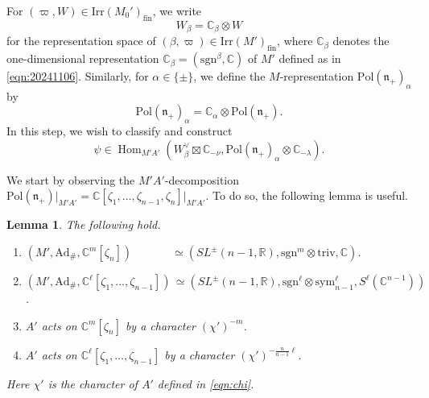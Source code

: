 \documentclass[reqno,11pt]{amsart}
\newtheorem{lem}[equation]{Lemma}
\theoremstyle{remark}
\theoremstyle{definition}
\numberwithin{equation}{section}
\newcommand{\gb}{\beta}
\newcommand{\ga}{\alpha}
\newcommand{\fn}{{\mathfrak n}}
\newcommand{\R}{\mathbb{R}}
\newcommand{\C}{\mathbb{C}}
\newcommand{\Ad}{\mathrm{Ad}}
\newcommand{\Hom}{\operatorname{Hom}}
\newcommand{\Pol}{\mathrm{Pol}}
\newcommand{\Irr}{\mathrm{Irr}}
\newcommand{\triv}{\mathrm{triv}}
\newcommand{\fin}{\mathrm{fin}}
\newcommand{\sym}{\mathrm{sym}}
\newcommand{\sgn}{\mathrm{sgn}}
\begin{document}
For $(\varpi, W) \in \Irr(M_0')_{\fin}$, we write
\begin{equation*}
W_{\beta} = \C_{\beta} \otimes W
\end{equation*}
for 
the representation
space of $(\beta, \varpi) \in \Irr(M')_{\fin}$, where 
$\C_\gb$ denotes the one-dimensional representation 
$\C_\gb = (\sgn^\beta, \C)$ of $M'$ defined as in 
\eqref{eqn:20241106}.
Similarly, for $\ga \in \{\pm\}$, we define 
the $M$-representation $\Pol(\fn_+)_\ga$ by
\begin{equation}\label{eqn:Pol}
\Pol(\fn_+)_\ga = \C_\ga \otimes \Pol(\fn_+).
\end{equation}
In this step, we wish to classify and construct
\begin{equation*}
\psi \in 
\Hom_{M'A'}(W_{\beta}^\vee\boxtimes \C_{-\nu}, 
\Pol(\fn_+)_{\alpha}
\otimes \C_{-\lambda}).
\end{equation*}

We start by observing the $M'A'$-decomposition
$\Pol(\fn_+)\vert_{M'A'} = \C[\zeta_1,\ldots, \zeta_{n-1}, \zeta_n]\vert_{M'A'}$.
To do so, the following lemma is useful. 

\begin{lem}\label{lem:MA}
The following hold.

\begin{enumerate}


\item[\emph{(1)}]
$(M', \Ad_\#, \C^m[\zeta_n]) 
\hspace{42pt}
\simeq (SL^\pm(n-1,\R), \sgn^m \otimes \triv, \C)$.

\item[\emph{(2)}]
$(M', \Ad_\#, \C^\ell[\zeta_1,\ldots, \zeta_{n-1}]) 
\hspace{2pt}
\simeq (SL^\pm(n-1,\R), \sgn^\ell \otimes \sym^\ell_{n-1}, S^\ell(\C^{n-1}))$.

\item[\emph{(3)}]
$A'$ acts on $\C^m[\zeta_n]$ by a character $(\chi')^{-m}$.

\item[\emph{(4)}]
$A'$ acts on $\C^\ell[\zeta_1,\ldots, \zeta_{n-1}]$ by a character 
$(\chi')^{-\frac{n}{n-1}\ell}$.

\end{enumerate}

Here $\chi'$ is the character of $A'$ defined in \eqref{eqn:chi}.

\end{lem}
\end{document}
